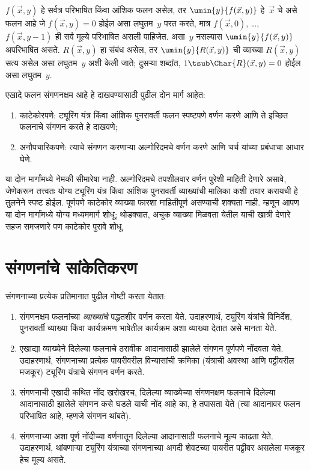 $f(\vec x, y)$ हे सर्वत्र परिभाषित किंवा आंशिक फलन असेल, तर
$\umin{y}{f (\vec x, y)}$ हे~$\vec x$ चे असे फलन आहे जे
$f(\vec x, y) = 0$ होईल असा लघुतम~$y$ परत करते, मात्र
$f(\vec x, 0)$, \dots, $f(\vec x, y-1)$ ही सर्व मूल्ये परिभाषित
असली पाहिजेत. असा~$y$ नसल्यास $\umin{y}{f (\vec x, y)}$
अपरिभाषित असते. $R(\vec x, y)$ हा संबंध असेल, तर
$\umin{y}{R(\vec x, y)}$ ची व्याख्या $R(\vec x, y)$ सत्य
असेल असा लघुतम~$y$ अशी केली जाते; दुसऱ्या शब्दांत,
$1 \tsub \Char{R}(\vec x, y) = 0$ होईल असा लघुतम~$y$.

एखादे फलन संगणनक्षम आहे हे दाखवण्यासाठी पुढील दोन मार्ग आहेत:
\begin{enumerate}
\item काटेकोरपणे: ट्यूरिंग यंत्र किंवा आंशिक पुनरावर्ती फलन स्पष्टपणे
  वर्णन करणे आणि ते इच्छित फलनाचे संगणन करते हे दाखवणे;
\item अनौपचारिकपणे: त्याचे संगणन करणाऱ्या अल्गोरिदमचे वर्णन करणे आणि
  चर्च यांच्या प्रबंधाचा आधार घेणे.
\end{enumerate}
या दोन मार्गांमध्ये नेमकी सीमारेषा नाही. अल्गोरिदमचे तपशीलवार
वर्णन पुरेशी माहिती देणारे असावे, जेणेकरून तत्त्वतः योग्य ट्यूरिंग
यंत्र किंवा आंशिक पुनरावर्ती व्याख्यांची मालिका कशी तयार करायची हे
तुलनेने स्पष्ट होईल. पूर्णपणे काटेकोर व्याख्या फारशा माहितीपूर्ण
असण्याची शक्यता नाही. म्हणून आपण या दोन मार्गांमध्ये योग्य मध्यममार्ग
शोधू; थोडक्यात, अचूक व्याख्या मिळवता येतील याची खात्री देणारे
सहज समजणारे पण काटेकोर पुरावे शोधू.











\section{संगणनांचे सांकेतिकरण}\label{cmp:thy:cod:sec}

संगणनाच्या प्रत्येक प्रतिमानात पुढील गोष्टी करता येतात:
\begin{enumerate}
\item संगणनक्षम फलनांच्या \emph{व्याख्यांचे} पद्धतशीर वर्णन करता येते.
  उदाहरणार्थ, ट्यूरिंग यंत्रांचे विनिर्देश, पुनरावर्ती व्याख्या किंवा
  कार्यक्रमण भाषेतील कार्यक्रम अशा व्याख्या देतात असे मानता येते.
\item एखाद्या व्याख्येने दिलेल्या फलनाचे ठरावीक आदानासाठी झालेले
  संगणन पूर्णपणे नोंदवता येते. उदाहरणार्थ, संगणनाच्या प्रत्येक पायरीवरील
  विन्यासांची क्रमिका (यंत्राची अवस्था आणि पट्टीवरील मजकूर) ट्यूरिंग
  यंत्राचे संगणन वर्णन करते.
\item संगणनाची एखादी कथित नोंद खरोखरच, दिलेल्या व्याख्येच्या
  संगणनक्षम फलनाचे दिलेल्या आदानासाठी झालेले संगणन कसे घडले याची नोंद
  आहे का, हे तपासता येते (त्या आदानावर फलन परिभाषित आहे, म्हणजे
  संगणन थांबते).
\item संगणनाच्या अशा पूर्ण नोंदीच्या वर्णनातून दिलेल्या आदानासाठी
  फलनाचे मूल्य काढता येते. उदाहरणार्थ, थांबणाऱ्या ट्यूरिंग यंत्राच्या
  संगणनाच्या अगदी शेवटच्या पायरीत पट्टीवर असलेला मजकूर हेच मूल्य असते.
\end{enumerate}

